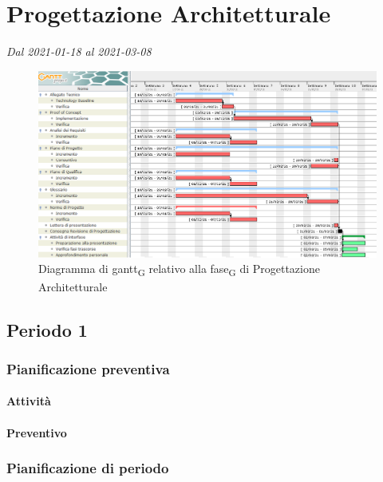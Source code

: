 \section{Progettazione Architetturale}
\textit{Dal 2021-01-18 al 2021-03-08}


\begin{figure}[H]
	\centering
	\includegraphics[scale=0.50]{res/images/03_gantt_progettazione.png}
	\caption{Diagramma di gantt\textsubscript{G} relativo alla fase\textsubscript{G} di Progettazione Architetturale}
\end{figure}


\subsection{Periodo 1}

\subsubsection{Pianificazione preventiva}

\paragraph{Attività}

\planningTable{
	
}

\paragraph{Preventivo}

\smallPreventivoTable{
	
}

\subsubsection{Pianificazione di periodo}

